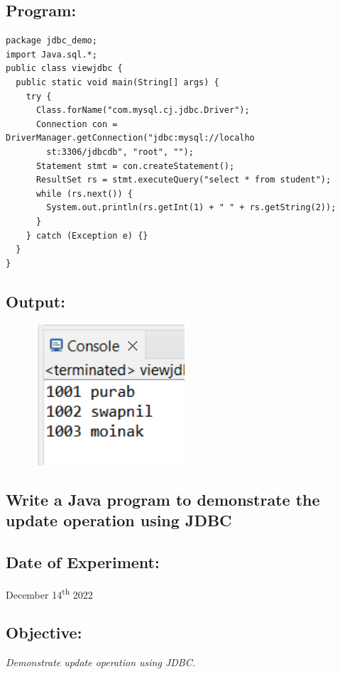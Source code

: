 \documentclass[12pt, a4paper]{article}
\begin{document}
\subsection*{Program:}
\begin{lstlisting}
package jdbc_demo;
import Java.sql.*;
public class viewjdbc {
  public static void main(String[] args) {
    try {
      Class.forName("com.mysql.cj.jdbc.Driver");
      Connection con = DriverManager.getConnection("jdbc:mysql://localho
        st:3306/jdbcdb", "root", "");
      Statement stmt = con.createStatement();
      ResultSet rs = stmt.executeQuery("select * from student");
      while (rs.next()) {
        System.out.println(rs.getInt(1) + " " + rs.getString(2));
      }
    } catch (Exception e) {}
  }
}
\end{lstlisting}
\newpage

\subsection*{Output:}
\begin{figure}[h]
  \includegraphics[width=0.5\textwidth]{vjdbc}
\end{figure}
\newpage

\begin{tcolorbox}
  \section{Write a Java program to demonstrate the update operation using JDBC}
\end{tcolorbox}

\subsection*{Date of Experiment:}
December 14\textsuperscript{th} 2022

\subsection*{Objective:}
\emph{\large{Demonstrate update operation using JDBC.}}
\end{document}
